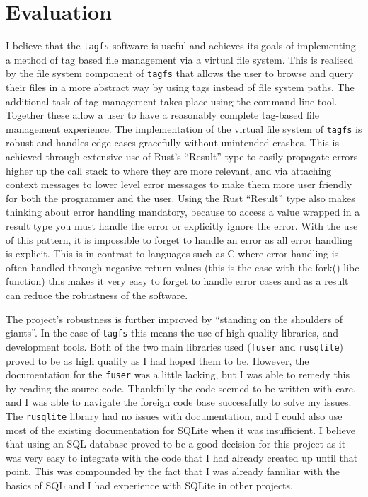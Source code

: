 \chapter{Evaluation}
\vspace{1cm}

I believe that the \texttt{tagfs} software is useful and achieves its goals of
implementing a method of tag based file management via a virtual file system.
This is realised by the file system component of \texttt{tagfs} that allows the
user to browse and query their files in a more abstract way by using tags
instead of file system paths. The additional task of tag management takes place
using the command line tool. Together these allow a user to have a reasonably
complete tag-based file management experience. The implementation of the
virtual file system of \texttt{tagfs} is robust and handles edge cases
gracefully without unintended crashes. This is achieved through extensive use
of Rust's ``Result'' type to easily propagate errors higher up the call stack
to where they are more relevant, and via attaching context messages to lower
level error messages to make them more user friendly for both the programmer
and the user. Using the Rust ``Result'' type also makes thinking about error
handling mandatory, because to access a value wrapped in a result type you must
handle the error or explicitly ignore the error. With the use of this pattern,
it is impossible to forget to handle an error as all error handling is
explicit. This is in contrast to languages such as C where error handling is
often handled through negative return values (this is the case with the fork()
libc function) this makes it very easy to forget to handle error cases and as a
result can reduce the robustness of the software.

The project's robustness is further improved by ``standing on the shoulders of
giants''. In the case of \texttt{tagfs} this means the use of high quality
libraries, and development tools. Both of the two main libraries used
(\texttt{fuser} and \texttt{rusqlite}) proved to be as high quality as I had
hoped them to be. However, the documentation for the \texttt{fuser} was a
little lacking, but I was able to remedy this by reading the source code.
Thankfully the code seemed to be written with care, and I was able to navigate
the foreign code base successfully to solve my issues. The \texttt{rusqlite}
library had no issues with documentation, and I could also use most of the
existing documentation for SQLite when it was insufficient. I believe that
using an SQL database proved to be a good decision for this project as it was
very easy to integrate with the code that I had already created up until that
point. This was compounded by the fact that I was already familiar with the
basics of SQL and I had experience with SQLite in other projects.

